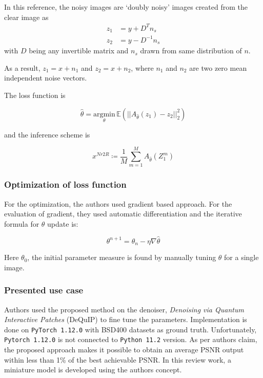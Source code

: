 \documentclass[
]{agujournal2019}
\begin{document}
In this reference, the noisy images are `doubly noisy' images created
from the clear image as \begin{align*}
z_1&=y+D^Tn_s\\
z_2&=y-D^{-1}n_s
\end{align*} with \(D\) being any invertible matrix and \(n_s\) drawn
from same distribution of \(n\).

As a result, \(z_1=x+n_1\) and \(z_2=x+n_2\), where \(n_1\) and \(n_2\)
are two zero mean independent noise vectors.

The loss function is

\[ \hat{\theta}=\underset{\theta}{\mathrm{argmin}}\,\mathbb{E} \left(||A_{\hat{\theta}} (z_1)-z_2||^2_2\right)\]

and the inference scheme is

\[x^{Nr2R}\coloneqq \frac{1}{M}\sum\limits_{m=1}^MA_{\hat{\theta}}(Z_1^m)\]

\subsubsection{Optimization of loss
function}\label{optimization-of-loss-function}

For the optimization, the authors used gradient based approach. For the
evaluation of gradient, they used automatic differentiation and the
iterative formula for \(\theta\) update is:

\[\theta^{n+1}=\theta_n-\eta \nabla \hat{\theta}\]

Here \(\theta_0\), the initial parameter measure is found by manually
tuning \(\theta\) for a single image.

\subsubsection{Presented use case}\label{presented-use-case}

Authors used the proposed method on the denoiser, \emph{Denoising via
Quantum Interactive Patches} (DeQuIP) to fine tune the parameters.
Implementation is done on \texttt{PyTorch\ 1.12.0} with BSD400 datasets
as ground truth. Unfortunately, \texttt{Pytorch\ 1.12.0} is not
connected to \texttt{Python\ 11.2} version. As per authors claim, the
proposed approach makes it possible to obtain an average PSNR output
within less than 1\% of the best achievable PSNR. In this review work, a
miniature model is developed using the authors concept.
\end{document}
